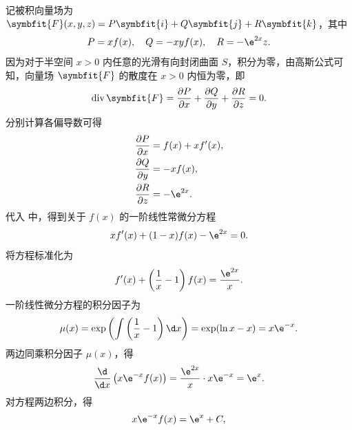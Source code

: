 \begin{solution}
    记被积向量场为 $\symbfit{F}(x, y, z) = P \symbfit{i} + Q \symbfit{j} + R \symbfit{k}$，其中
    \begin{equation}
        \label{eq:vector-field}
        P = x f(x), \quad Q = -x y f(x), \quad R = -\e^{2x} z.
    \end{equation}
    因为对于半空间 $x > 0$ 内任意的光滑有向封闭曲面 $S$，积分为零，由高斯公式可知，向量场 $\symbfit{F}$ 的散度在 $x > 0$ 内恒为零，即
    \begin{equation}
        \label{eq:div-zero}
        \operatorname{div} \symbfit{F} = \frac{\partial P}{\partial x} + \frac{\partial Q}{\partial y} + \frac{\partial R}{\partial z} = 0.
    \end{equation}
    分别计算各偏导数可得
    \begin{equation}
        \label{eq:partials}
        \begin{aligned}
            \frac{\partial P}{\partial x} & = f(x) + x f'(x), \\
            \frac{\partial Q}{\partial y} & = -x f(x),        \\
            \frac{\partial R}{\partial z} & = -\e^{2x}.
        \end{aligned}
    \end{equation}
    代入  中，得到关于 $f(x)$ 的一阶线性常微分方程
    \begin{equation}
        x f'(x) + (1 - x) f(x) - \e^{2x} = 0.
    \end{equation}
    将方程标准化为
    \begin{equation}
        \label{eq:ode-standard}
        f'(x) + \left(\frac{1}{x} - 1\right) f(x) = \frac{\e^{2x}}{x}.
    \end{equation}
    一阶线性微分方程的积分因子为
    \begin{equation}
        \label{eq:integrating-factor}
        \mu(x) = \exp \left( \int \left(\frac{1}{x} - 1\right) \d x \right) = \exp (\ln x - x) = x \e^{-x}.
    \end{equation}
     两边同乘积分因子 $\mu(x)$，得
    \begin{equation}
        \frac{\d}{\d x} \left( x \e^{-x} f(x) \right) = \frac{\e^{2x}}{x} \cdot x \e^{-x} = \e^x.
    \end{equation}
    对方程两边积分，得
    \begin{equation}
        \label{eq:integral-sol}
        x \e^{-x} f(x) = \e^x + C,
    \end{equation}

\end{solution}
